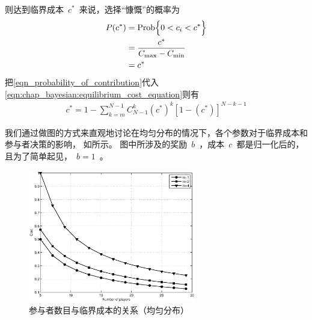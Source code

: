 则达到临界成本~$c^*$~来说，选择“慷慨”的概率为
\begin{align} 
    P(c^*) &= \text{Prob} \Bigl\{ 0 < c_i < c^*\Bigr\} \notag\\ 
    &= \frac{c^*}{C_{\max}-C_{\min}} \notag\\
    &= c^* 
    \label{eqn_probability_of_contribution} 
\end{align}
把\eqref{eqn_probability_of_contribution}代入\eqref{eqn:chap_bayesian:equilibrium_cost_equation}则有
\begin{align*} 
    c^* = 1- \sum_{k=m}^{N-1}C_{N-1}^k (c^*)^k [1-(c^*)]^{N-k-1}
\end{align*}

我们通过做图的方式来直观地讨论在均匀分布的情况下，各个参数对于临界成本和参与者决策的影响，
如所示。
图中所涉及的奖励~$b$~，成本~$c$~都是归一化后的，且为了简单起见，~$b = 1$~。
\begin{figure}[tb]
\begin{centering}
\includegraphics[width=0.65\textwidth]{bayesian_uniform_user_number_vs_contribute_probability.eps}
\caption{参与者数目与临界成本的关系（均匀分布）}
\label{fig:bayesian_user_numb_vs_contr_prob}
\end{centering}
\end{figure}
